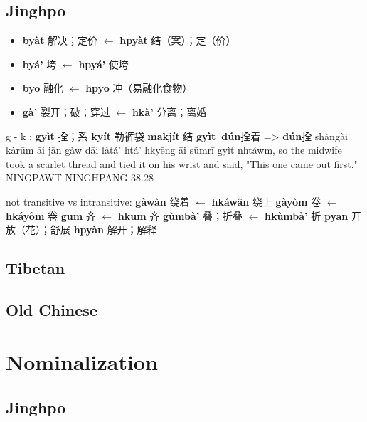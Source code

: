 \documentclass[oneside,a4paper,11pt]{article}
\newcommand{\ipa}[1]{\textbf{{\phon\mbox{#1}}}} %
\newcommand{\zh}[1]{{\cn #1}}
\begin{document}
 \subsection{Jinghpo}
 \citet[78]{dai92yufa}
\begin{itemize}
\item \ipa{byàt} \zh{解决；定价} $\leftarrow$ \ipa{hpyàt} \zh{结（案）；定（价）}
\item \ipa{byá'} \zh{垮} $\leftarrow$ \ipa{hpyá'} \zh{使垮} %
\item \ipa{byō} \zh{融化} $\leftarrow$ \ipa{hpyō} \zh{冲（易融化食物）} 
\item \ipa{gà'} \zh{裂开；破；穿过} $\leftarrow$ \ipa{hkà'} \zh{分离；离婚} 
\end{itemize}

g - k : 
  \ipa{gyìt} \zh{拴；系}  \ipa{kyít}   \zh{勒裤袋}
  \ipa{makjít} \zh{结} 
    \ipa{gyìt dún}\zh{拴着} =>  \ipa{dún}\zh{拴}
shàngài kàrūm āi jān gàw dāi làtá' htá' hkyēng āi sūmrī gyìt nhtáwm, 
so the midwife took a scarlet thread and tied it on his wrist and said, "This one came out first."
NINGPAWT NINGHPANG 38.28

not transitive vs intransitive:
 \ipa{gàwàn} \zh{绕着} $\leftarrow$ \ipa{hkáwân} \zh{绕上} %
 \ipa{gàyòm} \zh{卷} $\leftarrow$ \ipa{hkáyôm} \zh{卷} %
 \ipa{gūm} \zh{齐} $\leftarrow$ \ipa{hkum} \zh{齐} %
  \ipa{gùmbà'} \zh{叠；折叠} $\leftarrow$ \ipa{hkùmbà'} \zh{折} 
\ipa{pyān} \zh{开放（花）；舒展}  \ipa{hpyàn} \zh{解开；解释} %

\subsection{Tibetan}
\subsection{Old Chinese}
\section{Nominalization}
\subsection{Jinghpo}
\end{document}
